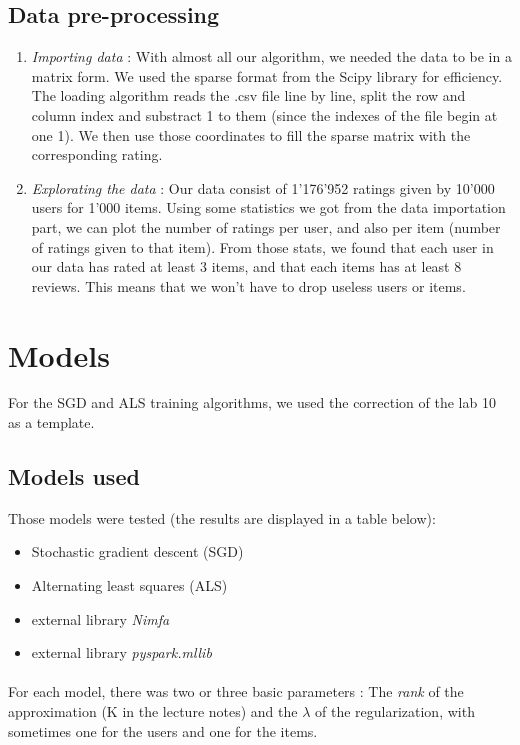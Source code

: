 \documentclass[a4paper]{article}
\begin{document}
\subsection{Data pre-processing}
\begin{enumerate}
\item \textit{Importing data} : With almost all our algorithm, we needed the data to be in a matrix form. We used the sparse format from the Scipy library for efficiency. The loading algorithm reads the .csv file line by line, split the row and column index and substract 1 to them (since the indexes of the file begin at one 1). We then use those coordinates to fill the sparse matrix with the corresponding rating.

\item \textit{Explorating the data} : Our data consist of 1'176'952 ratings given by 10'000 users for 1'000 items. Using some statistics we got from the data importation part, we can plot the number of ratings per user, and also per item (number of ratings given to that item). From those stats, we found that each user in our data has rated at least 3 items, and that each items has at least 8 reviews. This means that we won't have to drop useless users or items. 

\end{enumerate}

\section{Models}
For the SGD and ALS training algorithms, we used the correction of the lab 10 as a template.

\subsection{Models used}
Those models were tested (the results are displayed in a table below):

\begin{itemize}
\item Stochastic gradient descent (SGD)
\item Alternating least squares (ALS)
\item external library \textit{Nimfa}
\item external library \textit{pyspark.mllib}
\end{itemize}

\paragraph{}
For each model, there was two or three basic parameters : The \textit{rank} of the approximation (K in the lecture notes) and the \(\lambda\) of the regularization, with sometimes one for the users and one for the items. 
\end{document}
